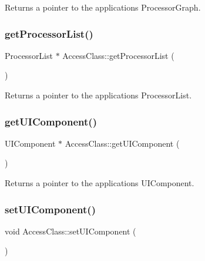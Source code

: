 Returns a pointer to the application\textquotesingle{}s Processor\+Graph. \mbox{\label{namespace_access_class_af8981a34e6624add46145d2a3226c6c7}} 
\subsubsection{\texorpdfstring{get\+Processor\+List()}{getProcessorList()}}
{\footnotesize\ttfamily Processor\+List $\ast$ Access\+Class\+::get\+Processor\+List (\begin{DoxyParamCaption}{ }\end{DoxyParamCaption})}

Returns a pointer to the application\textquotesingle{}s Processor\+List. \mbox{\label{namespace_access_class_a847041f47180bab4dd27e7b379f71ce9}} 
\subsubsection{\texorpdfstring{get\+U\+I\+Component()}{getUIComponent()}}
{\footnotesize\ttfamily U\+I\+Component $\ast$ Access\+Class\+::get\+U\+I\+Component (\begin{DoxyParamCaption}{ }\end{DoxyParamCaption})}

Returns a pointer to the application\textquotesingle{}s U\+I\+Component. \mbox{\label{namespace_access_class_a4f1f8ce54b0d1e3d6319efe95c858e1b}} 
\subsubsection{\texorpdfstring{set\+U\+I\+Component()}{setUIComponent()}}
{\footnotesize\ttfamily void Access\+Class\+::set\+U\+I\+Component (\begin{DoxyParamCaption}\item[{U\+I\+Component $\ast$}]{ }\end{DoxyParamCaption})}

